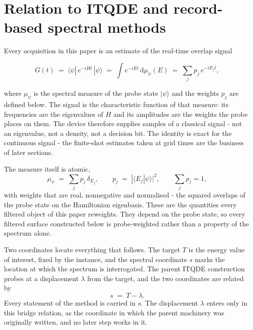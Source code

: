 \section{Relation to ITQDE and record-based spectral methods}\label{sec:N2}

Every acquisition in this paper is an estimate of the real-time overlap signal
\begin{widetext}
\[
G(t) \;=\; \langle\psi|\,e^{-iHt}\,|\psi\rangle \;=\; \int e^{-iEt}\,\mathrm{d}\mu_\psi(E) \;=\; \sum_j p_j\,e^{-iE_j t},
\]
\end{widetext}
where $\mu_\psi$ is the spectral measure of the probe state $|\psi\rangle$ and the weights $p_j$ are defined below. The signal is the characteristic function of that measure: its frequencies are the eigenvalues of $H$ and its amplitudes are the weights the probe places on them. The device therefore supplies samples of a classical signal - not an eigenvalue, not a density, not a decision bit. The identity is exact for the continuous signal - the finite-shot estimates taken at grid times are the business of later sections.

The measure itself is atomic,
\[
\mu_\psi \;=\; \sum_j p_j\,\delta_{E_j}, \qquad p_j \;=\; |\langle E_j|\psi\rangle|^2, \qquad \sum_j p_j = 1,
\]
with weights that are real, nonnegative and normalised - the squared overlaps of the probe state on the Hamiltonian eigenbasis. These are the quantities every filtered object of this paper reweights. They depend on the probe state, so every filtered surface constructed below is probe-weighted rather than a property of the spectrum alone.

Two coordinates locate everything that follows. The target $T$ is the energy value of interest, fixed by the instance, and the spectral coordinate $s$ marks the location at which the spectrum is interrogated. The parent ITQDE construction \cite{mccaul2025snacks} probes at a displacement $\lambda$ from the target, and the two coordinates are related by
\[
s \;=\; T - \lambda .
\]
Every statement of the method is carried in $s$. The displacement $\lambda$ enters only in this bridge relation, as the coordinate in which the parent machinery was originally written, and no later step works in it.

